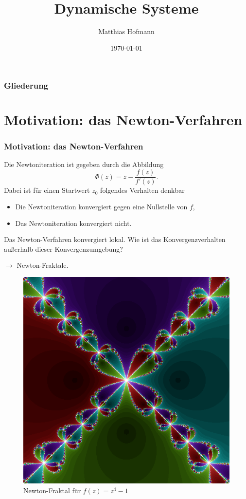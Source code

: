 \documentclass{beamer}
\title{Dynamische Systeme}
\author{Matthias Hofmann}
\date{\today}
\theoremstyle{definition}
\begin{document}
\begin{frame}
	\titlepage
\end{frame}

\begin{frame}
	\frametitle{Gliederung}
	\tableofcontents
\end{frame}

\section{Motivation: das Newton-Verfahren}
\begin{frame}
\frametitle{Motivation: das Newton-Verfahren}
Die Newtoniteration ist gegeben durch die Abbildung
\[
	\Phi(z)=z-\frac{f(z)}{f'(z)}.
\]
Dabei ist für einen Startwert $z_0$ folgendes Verhalten denkbar
\begin{itemize}
\item Die Newtoniteration konvergiert gegen eine Nullstelle von $f$,
\item Das Newtoniteration konvergiert nicht.
\end{itemize}

Das Newton-Verfahren konvergiert lokal. Wie ist das Konvergenzverhalten außerhalb dieser Konvergenzumgebung?

$\longrightarrow$ Newton-Fraktale.
\end{frame}

\begin{frame}
\begin{figure}
\centering
\includegraphics[scale=0.4]{fraktal.png}
\caption{Newton-Fraktal für $f(z)=z^4-1$}
\end{figure}
\end{frame}
\end{document}
